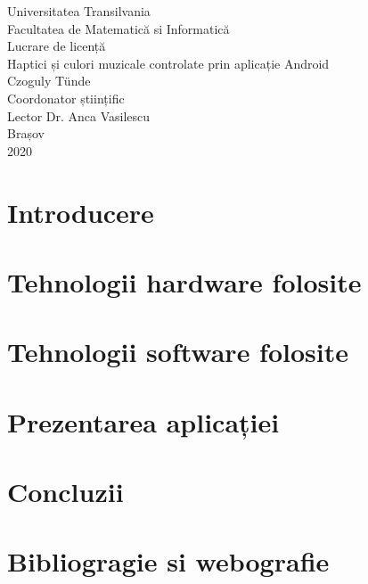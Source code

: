 \documentclass[a4paper, 12pt, titlepage]{article}
\begin{document}
\begin{titlepage}
\begin{center}
\vspace*{-3.0cm}
Universitatea Transilvania\\Facultatea de Matematică si Informatică
\\
\vspace{5.0cm}
\LARGE Lucrare de licență 
\\
\vspace{0.3cm}
Haptici și culori muzicale controlate prin aplicație Android
\\
\vspace{4.5cm}
\large Czoguly Tünde
\\
\vspace{0.8cm}
Coordonator științific \\  Lector Dr. Anca Vasilescu
\\
\vspace{5.0cm}
\normalsize Brașov\\2020
\end{center} 
\end{titlepage}

\tableofcontents

\newpage

\listoffigures

\newpage

\section{Introducere}


\newpage

\section{Tehnologii hardware folosite}


\newpage

\section{Tehnologii software folosite}


\newpage

\section{Prezentarea aplicației}


\newpage

\section{Concluzii}

\newpage

\section{Bibliogragie si webografie}


\end{document}
